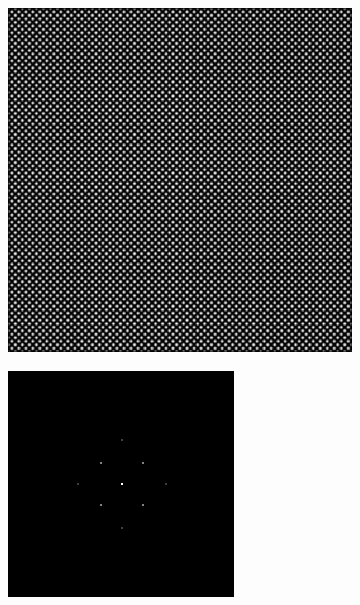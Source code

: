 	\begin{figure}[h]
		\centering
		\begin{subfigure}{0.4\textwidth}
			\centering
			\includegraphics[width=1\linewidth, scale=0.5]{./images/isosense_visualisation_real.png}
			\caption{}
			\label{fig:isosense_visualisation_real}
		\end{subfigure}
		\begin{subfigure}{0.4\textwidth}
			\centering
			\includegraphics[width=1\linewidth, scale=0.5]{./images/isosense_visualisation_ft.png}

\end{subfigure}
\end{figure}

